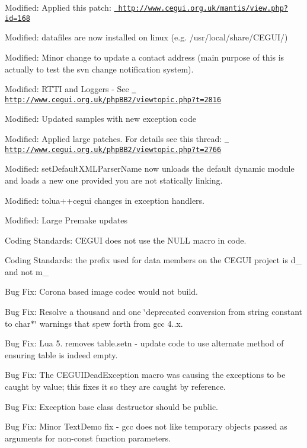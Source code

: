\begin{DoxyItemize}
\item Modified\+: Applied this patch\+: \href{http://www.cegui.org.uk/mantis/view.php?id=168}{\texttt{ http\+://www.\+cegui.\+org.\+uk/mantis/view.\+php?id=168}}
\item Modified\+: datafiles are now installed on linux (e.\+g. /usr/local/share/\+C\+E\+G\+U\+I/)
\item Modified\+: Minor change to update a contact address (main purpose of this is actually to test the svn change notification system).
\item Modified\+: R\+T\+TI and Loggers -\/ See \href{http://www.cegui.org.uk/phpBB2/viewtopic.php?t=2816}{\texttt{ http\+://www.\+cegui.\+org.\+uk/php\+B\+B2/viewtopic.\+php?t=2816}}
\item Modified\+: Updated samples with new exception code
\item Modified\+: Applied large patches. For details see this thread\+: \href{http://www.cegui.org.uk/phpBB2/viewtopic.php?t=2766}{\texttt{ http\+://www.\+cegui.\+org.\+uk/php\+B\+B2/viewtopic.\+php?t=2766}}
\item Modified\+: set\+Default\+X\+M\+L\+Parser\+Name now unloads the default dynamic module and loads a new one provided you are not statically linking.
\item Modified\+: tolua++cegui changes in exception handlers.
\item Modified\+: Large Premake updates
\item Coding Standards\+: C\+E\+G\+UI does not use the N\+U\+LL macro in code.
\item Coding Standards\+: the prefix used for data members on the C\+E\+G\+UI project is d\+\_\+ and not m\+\_\+
\item Bug Fix\+: Corona based image codec would not build.
\item Bug Fix\+: Resolve a thousand and one \char`\"{}deprecated conversion from string constant to \textquotesingle{}char$\ast$\textquotesingle{}\char`\"{} warnings that spew forth from gcc 4..\+x.
\item Bug Fix\+: Lua 5. removes table.\+setn -\/ update code to use alternate method of ensuring table is indeed empty.
\item Bug Fix\+: The C\+E\+G\+U\+I\+Dead\+Exception macro was causing the exceptions to be caught by value; this fixes it so they are caught by reference.
\item Bug Fix\+: Exception base class destructor should be public.
\item Bug Fix\+: Minor Text\+Demo fix -\/ gcc does not like temporary objects passed as arguments for non-\/const function parameters.

\end{DoxyItemize}

